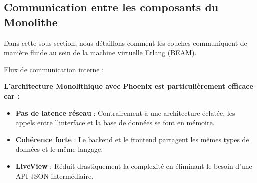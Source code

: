 \newpage

\subsection{Communication entre les composants du Monolithe}

Dans cette sous-section, nous détaillons comment les couches communiquent de manière fluide au sein de la machine virtuelle Erlang (BEAM).
\newline

\begin{for_you}{Flux de communication interne :}

\textbf{L'architecture Monolithique avec Phoenix est particulièrement efficace car :\newline}
    \begin{itemize}
        \item \textbf{Pas de latence réseau} : Contrairement à une architecture éclatée, les appels entre l'interface et la base de données se font en mémoire.
        \item \textbf{Cohérence forte} : Le backend et le frontend partagent les mêmes types de données et le même langage.
        \item \textbf{LiveView} : Réduit drastiquement la complexité en éliminant le besoin d'une API JSON intermédiaire.
        \newline
    \end{itemize}

  \begin{center}
    \end{center}
\end{for_you}

